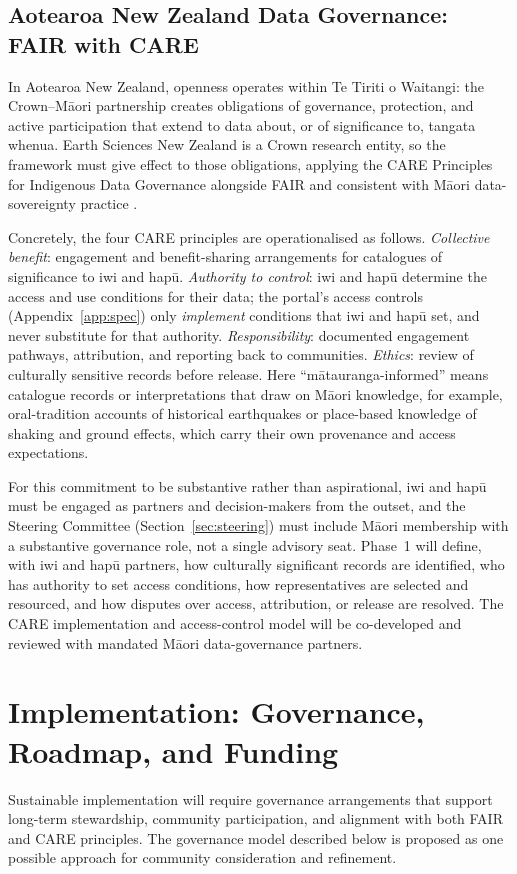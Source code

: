 \documentclass[11pt]{article}
\begin{document}
\subsection{Aotearoa New Zealand Data Governance: FAIR with CARE}
\label{sec:care}
In Aotearoa New Zealand, openness operates within Te Tiriti o Waitangi: the Crown--M\=aori partnership creates obligations of governance, protection, and active participation that extend to data about, or of significance to, tangata whenua. Earth Sciences New Zealand is a Crown research entity, so the framework must give effect to those obligations, applying the CARE Principles for Indigenous Data Governance \citep{CAREPrinciples2020} alongside FAIR and consistent with M\=aori data-sovereignty practice \citep{KukutaiTaylor2016}.

Concretely, the four CARE principles are operationalised as follows. \emph{Collective benefit}: engagement and benefit-sharing arrangements for catalogues of significance to iwi and hap\=u. \emph{Authority to control}: iwi and hap\=u determine the access and use conditions for their data; the portal's access controls (Appendix~\ref{app:spec}) only \emph{implement} conditions that iwi and hap\=u set, and never substitute for that authority. \emph{Responsibility}: documented engagement pathways, attribution, and reporting back to communities. \emph{Ethics}: review of culturally sensitive records before release. Here ``m\=atauranga-informed'' means catalogue records or interpretations that draw on M\=aori knowledge, for example, oral-tradition accounts of historical earthquakes or place-based knowledge of shaking and ground effects, which carry their own provenance and access expectations.

For this commitment to be substantive rather than aspirational, iwi and hap\=u must be engaged as partners and decision-makers from the outset, and the Steering Committee (Section~\ref{sec:steering}) must include M\=aori membership with a substantive governance role, not a single advisory seat. Phase~1 will define, with iwi and hap\=u partners, how culturally significant records are identified, who has authority to set access conditions, how representatives are selected and resourced, and how disputes over access, attribution, or release are resolved. The CARE implementation and access-control model will be co-developed and reviewed with mandated M\=aori data-governance partners.

\section{Implementation: Governance, Roadmap, and Funding}
\label{sec:implementation}
Sustainable implementation will require governance arrangements that support long-term stewardship, community participation, and alignment with both FAIR and CARE principles. The governance model described below is proposed as one possible approach for community consideration and refinement.
\end{document}

